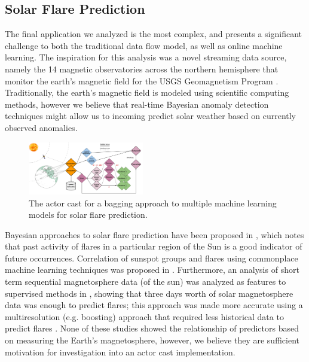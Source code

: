 \documentclass[conference,twocolumn,10pt]{IEEEtran}
\begin{document}
\subsection{Solar Flare Prediction}

The final application we analyzed is the most complex, and presents a significant challenge to both the traditional data flow model, as well as online machine learning. The inspiration for this analysis was a novel streaming data source, namely the 14 magnetic observatories across the northern hemisphere that monitor the earth's magnetic field for the USGS Geomagnetism Program \cite{love_usgs_2011}. Traditionally, the earth's magnetic field is modeled using scientific computing methods, however we believe that real-time Bayesian anomaly detection techniques \cite{hill_real-time_2007} might allow us to incoming predict solar weather based on currently observed anomalies.

\begin{figure}[!t]
    \centering
    \includegraphics[width=0.45\textwidth]{solar_cast}
    \caption{The actor cast for a bagging approach to multiple machine learning models for solar flare prediction.}
    \label{fig:solar_cast}
\end{figure}

Bayesian approaches to solar flare prediction have been proposed in \cite{wheatland_bayesian_2004}, which notes that past activity of flares in a particular region of the Sun is a good indicator of future occurrences. Correlation of sunspot groups and flares using commonplace machine learning techniques was proposed in \cite{qahwaji_automatic_2007}. Furthermore, an analysis of short term sequential magnetosphere data (of the sun) was analyzed as features to supervised methods in \cite{yu_short-term_2009}, showing that three days worth of solar magnetosphere data was enough to predict flares; this approach was made more accurate using a multiresolution (e.g. boosting) approach that required less historical data to predict flares \cite{yu_short-term_2010}. None of these studies showed the relationship of predictors based on measuring the Earth's magnetosphere, however, we believe they are sufficient motivation for investigation into an actor cast implementation.
\end{document}
